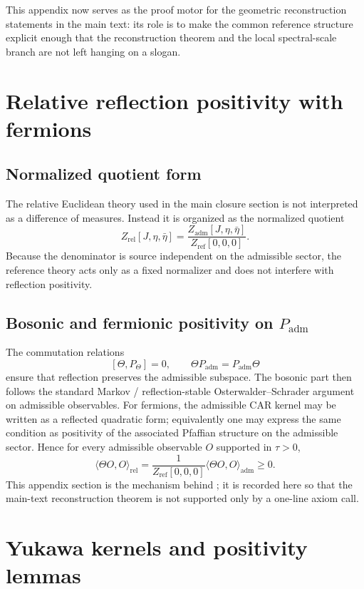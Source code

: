 \documentclass[11pt,a4paper]{article}
\theoremstyle{definition}
\theoremstyle{remark}
\newcommand{\Padm}{P_{\mathrm{adm}}}
\begin{document}
This appendix now serves as the proof motor for the geometric reconstruction statements in the main text: its role is to make the common reference structure explicit enough that the reconstruction theorem and the local spectral-scale branch are not left hanging on a slogan.

\section{Relative reflection positivity with fermions}
\label{app:os-fermions}

\subsection{Normalized quotient form}

The relative Euclidean theory used in the main closure section is not interpreted as a difference of measures. Instead it is organized as the normalized quotient
\[
Z_{\mathrm{rel}}[J,\eta,\bar\eta]
=
\frac{Z_{\mathrm{adm}}[J,\eta,\bar\eta]}{Z_{\mathrm{ref}}[0,0,0]}.
\]
Because the denominator is source independent on the admissible sector, the reference theory acts only as a fixed normalizer and does not interfere with reflection positivity.

\subsection{Bosonic and fermionic positivity on \texorpdfstring{$\Padm$}{Padm}}

The commutation relations
\[
[\Theta,P_\Theta]=0,
\qquad
\Theta\Padm=\Padm\Theta
\]
ensure that reflection preserves the admissible subspace. The bosonic part then follows the standard Markov / reflection-stable Osterwalder--Schrader argument on admissible observables. For fermions, the admissible CAR kernel may be written as a reflected quadratic form; equivalently one may express the same condition as positivity of the associated Pfaffian structure on the admissible sector. Hence for every admissible observable $O$ supported in $\tau>0$,
\[
\langle \Theta O,O\rangle_{\mathrm{rel}}
=
\frac{1}{Z_{\mathrm{ref}}[0,0,0]}
\langle \Theta O,O\rangle_{\mathrm{adm}}
\ge 0.
\]
This appendix section is the mechanism behind ; it is recorded here so that the main-text reconstruction theorem is not supported only by a one-line axiom call.

\section{Yukawa kernels and positivity lemmas}
\label{app:yukawa}
\end{document}
